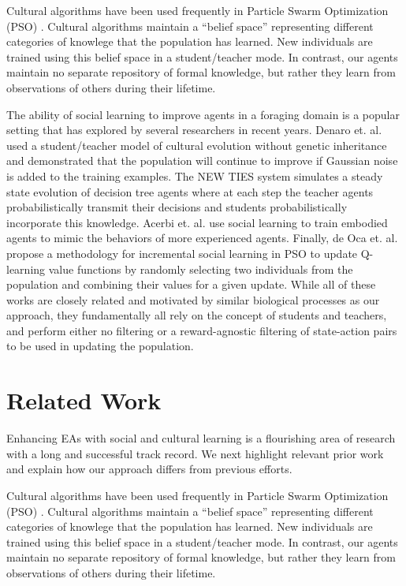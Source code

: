 \documentclass{acm_proc_article-sp}
\begin{document}
Cultural algorithms \cite{reynolds1994introduction} have been used frequently in Particle Swarm Optimization (PSO) \cite{kennedy1995particle}. Cultural algorithms maintain a ``belief space'' representing different categories of knowlege that the population has learned. New individuals are trained using this belief space in a student/teacher mode. In contrast, our agents maintain no separate repository of formal knowledge, but rather they learn from observations of others during their lifetime.

The ability of social learning to improve agents in a foraging domain is a popular setting that has explored by several researchers in recent years. Denaro et. al. \cite{denaro1996cultural} used a student/teacher model of cultural evolution without genetic inheritance and demonstrated that the population will continue to improve if Gaussian noise is added to the training examples. The NEW TIES system \cite{haasdijk2008social, vogt2010modeling} simulates a steady state evolution of decision tree agents where at each step the teacher agents probabilistically transmit their decisions and students probabilistically incorporate this knowledge. Acerbi et. al. \cite{acerbi2007social} use social learning to train embodied agents to mimic the behaviors of more experienced agents. Finally, de Oca et. al. \cite{de2011incremental} propose a methodology for incremental social learning in PSO to update Q-learning \cite{watkins1992q} value functions by randomly selecting two individuals from the population and combining their values for a given update. While all of these works are closely related and motivated by similar biological processes as our approach, they fundamentally all rely on the concept of students and teachers, and perform either no filtering or a reward-agnostic filtering of state-action pairs to be used in updating the population.

\section{Related Work}
\label{sec:related}
Enhancing EAs with social and cultural learning is a flourishing area of research with a long and successful track record.
We next highlight relevant prior work and explain how our approach differs from previous efforts.

Cultural algorithms \cite{reynolds1994introduction} have been used frequently in Particle Swarm Optimization (PSO) \cite{kennedy1995particle}. Cultural algorithms maintain a ``belief space'' representing different categories of knowlege that the population has learned. New individuals are trained using this belief space in a student/teacher mode. In contrast, our agents maintain no separate repository of formal knowledge, but rather they learn from observations of others during their lifetime.
\end{document}
